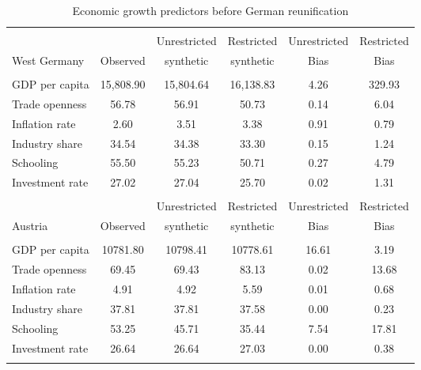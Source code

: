 \begin{table}[H]\centering 
\caption{Economic growth predictors before German reunification} 
\label{predictors} 
\begin{tabular}{@{\extracolsep{5pt}} lccccc} 
\\[-1.8ex]\hline 
\hline \\[-1.8ex] 
 & &  Unrestricted& Restricted &Unrestricted& Restricted  \\ 
West Germany	& Observed  &synthetic &  synthetic & Bias & Bias\\
\hline \\[-1.8ex] 
GDP per capita & 15,808.90 & 15,804.64 & 16,138.83 & 4.26 & 329.93 \\ 
Trade openness & 56.78 & 56.91 & 50.73 & 0.14 & 6.04 \\ 
Inflation rate & 2.60 & 3.51 & 3.38 & 0.91 & 0.79 \\ 
Industry share & 34.54 & 34.38 & 33.30 & 0.15 & 1.24 \\ 
Schooling & 55.50 & 55.23 & 50.71 & 0.27 & 4.79 \\ 
Investment rate & 27.02 & 27.04 & 25.70 & 0.02 & 1.31 \\ 
\hline \\[-1.8ex] 
 & &  Unrestricted& Restricted &Unrestricted& Restricted  \\ 
Austria	& Observed  &synthetic &  synthetic & Bias & Bias\\
\hline \\[-1.8ex] 
GDP per capita & 10781.80 & 10798.41 & 10778.61 & 16.61 & 3.19 \\ 
Trade openness & 69.45 & 69.43 & 83.13 & 0.02 & 13.68 \\ 
Inflation rate & 4.91 & 4.92 & 5.59 & 0.01 & 0.68 \\ 
Industry share & 37.81 & 37.81 & 37.58 & 0.00 & 0.23 \\ 
Schooling & 53.25 & 45.71 & 35.44 & 7.54 & 17.81 \\ 
Investment rate & 26.64 & 26.64 & 27.03 & 0.00 & 0.38 \\ 
\hline \\[-1.8ex] 
\end{tabular} 
\end{table} 
